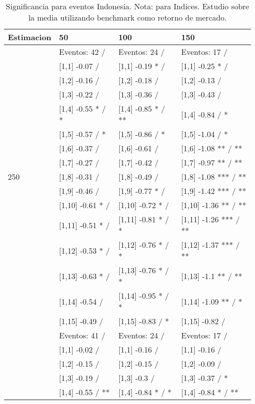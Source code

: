 \begin{table}

\caption{Significancia para eventos Indonesia. Nota: para Indices. Estudio sobre la media utilizando benchmark como retorno de mercado.}
\centering
\begin{tabular}[t]{llll}
\toprule
Estimacion & 50 & 100 & 150\\
\midrule
 & Eventos:  42 / & Eventos:  24 / & Eventos:  17 /\\
 & {}[1,1] -0.07  / & {}[1,1] -0.19 * / & {}[1,1] -0.25 * /\\
 & {}[1,2] -0.16  / & {}[1,2] -0.18  / & {}[1,2] -0.13  /\\
 & {}[1,3] -0.22  / & {}[1,3] -0.36  / & {}[1,3] -0.43  /\\
 & {}[1,4] -0.55 * / * & {}[1,4] -0.85 * / ** & {}[1,4] -0.84  / *\\
\addlinespace
 & {}[1,5] -0.57  / * & {}[1,5] -0.86  / * & {}[1,5] -1.04  / *\\
 & {}[1,6] -0.37  / & {}[1,6] -0.61  / & {}[1,6] -1.08 ** / **\\
 & {}[1,7] -0.27  / & {}[1,7] -0.42  / & {}[1,7] -0.97 ** / **\\
250 & {}[1,8] -0.31  / & {}[1,8] -0.49  / & {}[1,8] -1.08 *** / **\\
 & {}[1,9] -0.46  / & {}[1,9] -0.77 * / & {}[1,9] -1.42 *** / **\\
\addlinespace
 & {}[1,10] -0.61 * / & {}[1,10] -0.72 * / & {}[1,10] -1.36 ** / **\\
 & {}[1,11] -0.51 * / & {}[1,11] -0.81 * / * & {}[1,11] -1.26 *** / **\\
 & {}[1,12] -0.53 * / & {}[1,12] -0.76 * / * & {}[1,12] -1.37 *** / **\\
 & {}[1,13] -0.63 * / & {}[1,13] -0.76 * / * & {}[1,13] -1.1 ** / **\\
 & {}[1,14] -0.54  / & {}[1,14] -0.95 * / * & {}[1,14] -1.09 ** / *\\
\addlinespace
 & {}[1,15] -0.49  / & {}[1,15] -0.83  / * & {}[1,15] -0.82  /\\
 & Eventos:  41 / & Eventos:  24 / & Eventos:  17 /\\
 & {}[1,1] -0.02  / & {}[1,1] -0.16  / & {}[1,1] -0.16  /\\
 & {}[1,2] -0.15  / & {}[1,2] -0.15  / & {}[1,2] -0.09  /\\
 & {}[1,3] -0.19  / & {}[1,3] -0.3  / & {}[1,3] -0.37  / *\\
\addlinespace
 & {}[1,4] -0.55  / ** & {}[1,4] -0.84 * / * & {}[1,4] -0.84 * / **\\

\end{tabular}
\end{table}
